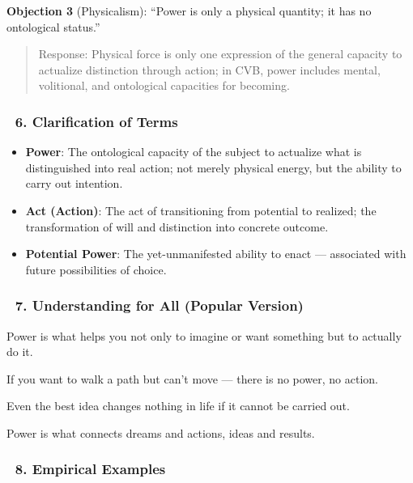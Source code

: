 \documentclass[12pt]{article}
\begin{document}
\textbf{Objection 3} (Physicalism): ``Power is only a physical quantity; it has no ontological status.''

\begin{quote}
Response: Physical force is only one expression of the general capacity to actualize distinction through action; in CVB, power includes mental, volitional, and ontological capacities for becoming.
\end{quote}

\subsubsection*{🔹 6. Clarification of Terms}

\begin{itemize}
\item \textbf{Power}: The ontological capacity of the subject to actualize what is distinguished into real action; not merely physical energy, but the ability to carry out intention.
\item \textbf{Act (Action)}: The act of transitioning from potential to realized; the transformation of will and distinction into concrete outcome.
\item \textbf{Potential Power}: The yet-unmanifested ability to enact — associated with future possibilities of choice.
\end{itemize}

\subsubsection*{🔹 7. Understanding for All (Popular Version)}

Power is what helps you not only to imagine or want something but to actually do it.

If you want to walk a path but can’t move — there is no power, no action.

Even the best idea changes nothing in life if it cannot be carried out.

Power is what connects dreams and actions, ideas and results.

\subsubsection*{🔹 8. Empirical Examples}
\end{document}
